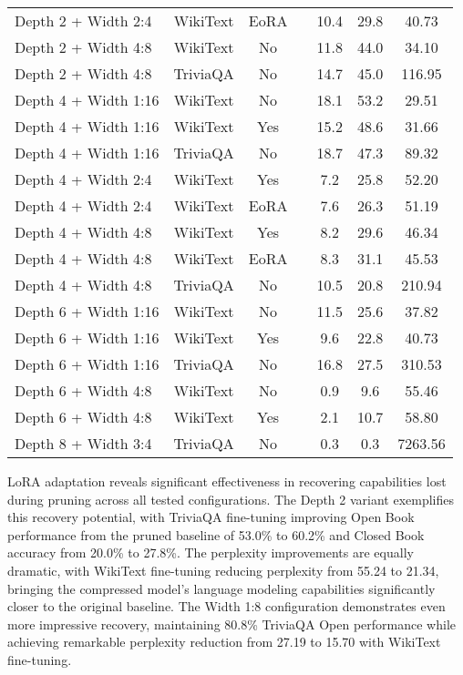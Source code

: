 {\begin{table}[htbp]
\begin{tabular}{lcclccc}
Depth 2 + Width 2:4 & WikiText & EoRA & & 10.4 & 29.8 & 40.73  \\
Depth 2 + Width 4:8 & WikiText & No & & 11.8 & 44.0 & 34.10  \\
Depth 2 + Width 4:8 & TriviaQA & No & & 14.7 & 45.0 & 116.95  \\
Depth 4 + Width 1:16 & WikiText & No & & 18.1 & 53.2 & 29.51  \\
Depth 4 + Width 1:16 & WikiText & Yes & & 15.2 & 48.6 & 31.66  \\
Depth 4 + Width 1:16 & TriviaQA & No & & 18.7 & 47.3 & 89.32  \\
Depth 4 + Width 2:4 & WikiText & Yes & & 7.2 & 25.8 & 52.20  \\
Depth 4 + Width 2:4 & WikiText & EoRA & & 7.6 & 26.3 & 51.19  \\
Depth 4 + Width 4:8 & WikiText & Yes & & 8.2 & 29.6 & 46.34  \\
Depth 4 + Width 4:8 & WikiText & EoRA & & 8.3 & 31.1 & 45.53  \\
Depth 4 + Width 4:8 & TriviaQA & No & & 10.5 & 20.8 & 210.94  \\
Depth 6 + Width 1:16 & WikiText & No & & 11.5 & 25.6 & 37.82  \\
Depth 6 + Width 1:16 & WikiText & Yes & & 9.6 & 22.8 & 40.73  \\
Depth 6 + Width 1:16 & TriviaQA & No & & 16.8 & 27.5 & 310.53  \\
Depth 6 + Width 4:8 & WikiText & No & & 0.9 & 9.6 & 55.46  \\
Depth 6 + Width 4:8 & WikiText & Yes & & 2.1 & 10.7 & 58.80  \\
Depth 8 + Width 3:4 & TriviaQA & No & & 0.3 & 0.3 & 7263.56  \\
\hline
\end{tabular}
\end{table}
}


LoRA adaptation reveals significant effectiveness in recovering capabilities lost during pruning across all tested configurations. The Depth 2 variant exemplifies this recovery potential, with TriviaQA fine-tuning improving Open Book performance from the pruned baseline of 53.0\% to 60.2\% and Closed Book accuracy from 20.0\% to 27.8\%. The perplexity improvements are equally dramatic, with WikiText fine-tuning reducing perplexity from 55.24 to 21.34, bringing the compressed model's language modeling capabilities significantly closer to the original baseline. The Width 1:8 configuration demonstrates even more impressive recovery, maintaining 80.8\% TriviaQA Open performance while achieving remarkable perplexity reduction from 27.19 to 15.70 with WikiText fine-tuning.

